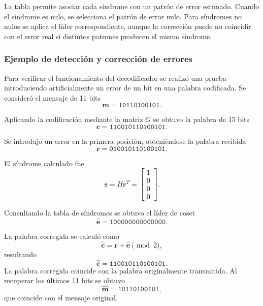 La tabla permite asociar cada síndrome con un
patrón de error estimado. Cuando el síndrome
es nulo, se selecciona el patrón de error nulo.
Para síndromes no nulos se aplica el líder
correspondiente, aunque la corrección puede
no coincidir con el error real si distintos
patrones producen el mismo síndrome.


\subsubsection{Ejemplo de detección y corrección de errores}

Para verificar el funcionamiento del decodificador
se realizó una prueba introduciendo artificialmente
un error de un bit en una palabra codificada.
Se consideró el mensaje de 11 bits
\begin{equation}
    \mathbf{m}=\texttt{10110100101}.
\end{equation}

Aplicando la codificación mediante la matriz $G$
se obtuvo la palabra de 15 bits
\begin{equation}
    \mathbf{c}=\texttt{110010110100101}.
\end{equation}

Se introdujo un error en la primera posición,
obteniéndose la palabra recibida
\begin{equation}
    \mathbf{r}=\texttt{010010110100101}.
\end{equation}

El síndrome calculado fue
\begin{equation}
    \mathbf{s}=H\mathbf{r}^T
    =
    \begin{bmatrix}
        1\\0\\0\\0
    \end{bmatrix}.
\end{equation}

Consultando la tabla de síndromes se obtuvo
el líder de coset
\begin{equation}
    \hat{\mathbf{e}}=
    \texttt{100000000000000}.
\end{equation}

La palabra corregida se calculó como
\begin{equation}
    \hat{\mathbf{c}}=
    \mathbf{r}+\hat{\mathbf{e}}\pmod 2,
\end{equation}
resultando
\begin{equation}
    \boxed{
    \hat{\mathbf{c}}=
    \texttt{110010110100101}
    }.
\end{equation}
La palabra corregida coincide con la palabra
originalmente transmitida.
Al recuperar los últimos 11 bits se obtuvo
\begin{equation}
    \hat{\mathbf{m}}=
    \texttt{10110100101},
\end{equation}
que coincide con el mensaje original.

